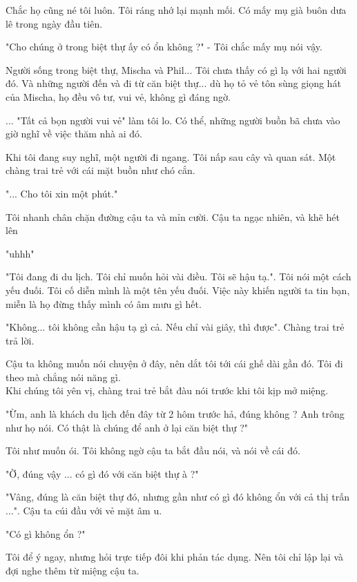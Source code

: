 Chắc họ cũng né tôi luôn. Tôi ráng nhớ lại mạnh mối. Có mấy mụ già buôn dưa lê trong ngày đầu tiên.

"Cho chúng ở trong biệt thự ấy có ổn không ?" - Tôi chắc mấy mụ nói vậy.

Người sống trong biệt thự, Mischa và Phil... Tôi chưa thấy có gì lạ với hai người đó. Và những người đến và đi từ căn biệt thự... dù họ tỏ vẻ tôn sùng giọng hát của Mischa, họ đều vô tư, vui vẻ, không gì đáng ngờ.

... "Tất cả bọn người vui vẻ" làm tôi lo. Có thể, những người buồn bã chưa vào giờ nghĩ về việc thăm nhà ai đó.

Khi tôi đang suy nghĩ, một người đi ngang. Tôi nấp sau cây và quan sát. Một chàng trai trẻ với cái mặt buồn như chó cắn.

"... Cho tôi xin một phút."

Tôi nhanh chân chặn đường cậu ta và mỉn cười. Cậu ta ngạc nhiên, và khẽ hét lên

"uhhh"

"Tôi đang đi du lịch. Tôi chỉ muốn hỏi vài điều. Tôi sẽ hậu tạ.". Tôi nói một cách yếu đuối. Tôi cố diễn mình là một tên yếu đuối. Việc này khiến người ta tin bạn, miễn là họ đừng thấy mình có âm mưu gì hết.

"Không... tôi không cần hậu tạ gì cả. Nếu chỉ vài giây, thì được". Chàng trai trẻ trả lời.

Cậu ta không muốn nói chuyện ở đây, nên dắt tôi tới cái ghế dài gần đó. Tôi đi theo mà chẳng nói năng gì. \\


Khi chúng tôi yên vị, chàng trai trẻ bắt đàu nói trước khi tôi kịp mở miệng.

"Ừm, anh là khách du lịch đến đây từ 2 hôm trước hả, đúng không ? Anh trông như họ nói. Có thật là chúng để anh ở lại căn biệt thự ?"

Tôi như muốn ói. Tôi không ngờ cậu ta bắt đầu nói, và nói về cái đó.

"Ờ, đúng vậy ... có gì đó với căn biệt thự à ?"

"Vâng, đúng là căn biệt thự đó, nhưng gần như có gì đó không ổn với cả thị trấn ...". Cậu ta cúi đầu với vẻ mặt âm u.

"Có gì không ổn ?"

Tôi để ý ngay, nhưng hỏi trực tiếp đôi khi phản tác dụng. Nên tôi chỉ lập lại và đợi nghe thêm từ miệng cậu ta.

